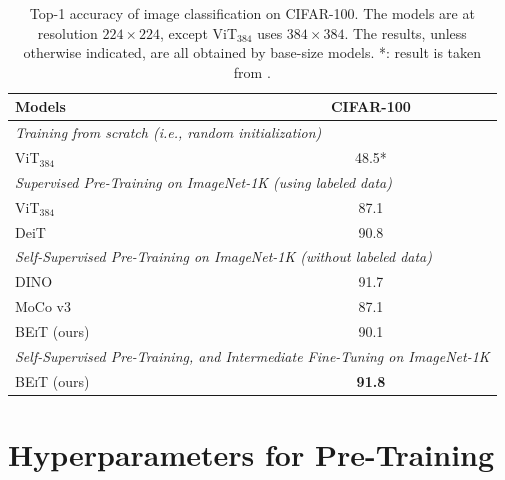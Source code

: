 \documentclass{article}
\newcommand\our{\textsc{BEiT}}
\begin{document}
\begin{table}[h]
\centering
\begin{tabular}{@{}lc@{}}
\toprule
\bf Models & \bf CIFAR-100 \\
\midrule
\multicolumn{2}{l}{\textit{Training from scratch (i.e., random initialization)}} \\
ViT$_{384}$~\citep{vit} & 48.5* \\
\midrule
\multicolumn{2}{l}{\textit{Supervised Pre-Training on ImageNet-1K (using labeled data)}} \\
ViT$_{384}$~\citep{vit} & 87.1 \\
DeiT~\citep{deit}           & 90.8 \\
\midrule
\multicolumn{2}{l}{\textit{Self-Supervised Pre-Training on ImageNet-1K (without labeled data)}} \\
DINO~\citep{dino}           & 91.7 \\
MoCo v3~\citep{mocov3}           & 87.1 \\
\our{} (ours)                                    & 90.1 \\
\midrule
\multicolumn{2}{l}{\textit{Self-Supervised Pre-Training, and Intermediate Fine-Tuning on ImageNet-1K}} \\
\our{} (ours)                                     &  \bf 91.8 \\
\bottomrule
\end{tabular}
\caption{Top-1 accuracy of image classification on CIFAR-100.
The models are at resolution $224\times224$, except ViT$_{384}$ uses $384\times384$.
The results, unless otherwise indicated, are all obtained by base-size models.
*: result is taken from \citep{mocov3}.}
\label{tbl:results:cifar}
\end{table}


\section{Hyperparameters for Pre-Training}
\label{app:pretrain}
\end{document}
